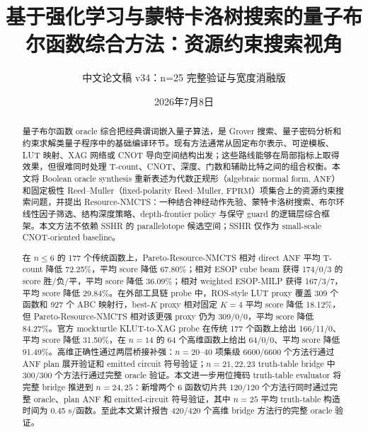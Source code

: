 \documentclass[UTF8,fontset=macnew,11pt]{ctexart}
\title{基于强化学习与蒙特卡洛树搜索的量子布尔函数综合方法：资源约束搜索视角}
\author{中文论文稿 v34：n=25 完整验证与宽度消融版}
\date{2026年7月8日}
\newcommand{\method}{Resource-NMCTS}
\newcommand{\anf}{\ensuremath{\mathrm{ANF}}}
\newcommand{\fprm}{\ensuremath{\mathrm{FPRM}}}
\begin{document}
\pagestyle{plain}
\maketitle

\begin{abstract}
量子布尔函数 oracle 综合把经典谓词嵌入量子算法，是 Grover 搜索、量子密码分析和约束求解类量子程序中的基础编译环节。现有方法通常从固定布尔表示、可逆模板、LUT 映射、XAG 网络或 CNOT 导向空间结构出发；这些路线能够在局部指标上取得效果，但很难同时处理 T-count、CNOT、深度、门数和辅助比特之间的组合权衡。本文将 Boolean oracle synthesis 重新表述为代数正规形（algebraic normal form, \anf{}）和固定极性 Reed--Muller（fixed-polarity Reed--Muller, \fprm{}）项集合上的资源约束搜索问题，并提出 \method{}：一种结合神经动作先验、蒙特卡洛树搜索、布尔环线性因子筛选、结构深度策略、depth-frontier policy 与保守 guard 的逻辑层综合框架。本文方法不依赖 SSHR 的 parallelotope 候选空间；SSHR 仅作为 small-scale CNOT-oriented baseline。

在 $n\leq6$ 的 177 个传统函数上，Pareto-\method{} 相对 direct \anf{} 平均 T-count 降低 72.25\%，平均 score 降低 67.80\%；相对 ESOP cube beam 获得 174/0/3 的 score 胜/负/平，平均 score 降低 36.09\%；相对 weighted ESOP-MILP 获得 167/3/7，平均 score 降低 29.84\%。在外部工具链 probe 中，ROS-style LUT proxy 覆盖 309 个函数和 927 个 ABC 映射行，best-$K$ proxy 相对固定 $K=4$ 平均 score 降低 18.12\%，但 Pareto-\method{} 相对该更强 proxy 仍为 309/0/0，平均 score 降低 84.27\%。官方 mockturtle KLUT-to-XAG probe 在传统 177 个函数上给出 166/11/0、平均 score 降低 31.50\%，在 $n=14$ 的 64 个高维函数上给出 64/0/0、平均 score 降低 91.49\%。高维正确性通过两层桥接补强：$n=20$--$40$ 项集级 6600/6600 个方法行通过 \anf{} plan 展开验证和 emitted circuit 符号验证；$n=21,22,23$ truth-table bridge 中 300/300 个方法行通过完整 oracle 验证。本文进一步用位掩码 truth-table evaluator 将完整 bridge 推进到 $n=24,25$：新增两个 6 函数切片共 120/120 个方法行同时通过完整 oracle、plan \anf{} 和 emitted-circuit 符号验证，其中 $n=25$ 平均 truth-table 构造时间为 0.45 s/函数。至此本文累计报告 420/420 个高维 bridge 方法行的完整 oracle 验证。


\end{abstract}
\end{document}
